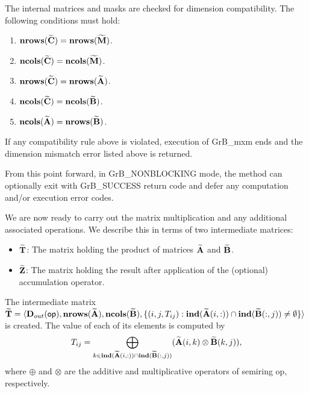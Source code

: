 The internal matrices and masks are checked for dimension compatibility. The following
conditions must hold:
\begin{enumerate}
	\item $\bold{nrows}({\bf \widetilde{C}}) = \bold{nrows}({\bf \widetilde{M}})$.

	\item $\bold{ncols}({\bf \widetilde{C}}) = \bold{ncols}({\bf \widetilde{M}})$.

	\item $\bold{nrows}({\bf \widetilde{C}}) = \bold{nrows}({\bf \widetilde{A}})$.

	\item $\bold{ncols}({\bf \widetilde{C}}) = \bold{ncols}({\bf \widetilde{B}})$.

	\item $\bold{ncols}({\bf \widetilde{A}}) = \bold{nrows}({\bf \widetilde{B}})$.
\end{enumerate}
If any compatibility rule above is violated, execution of {\sf GrB\_mxm} ends and
the dimension mismatch error listed above is returned.

From this point forward, in {\sf GrB\_NONBLOCKING} mode, the method can 
optionally exit with {\sf GrB\_SUCCESS} return code and defer any computation 
and/or execution error codes.

We are now ready to carry out the matrix multiplication and any additional 
associated operations.  We describe this in terms of two intermediate matrices:
\begin{itemize}
    \item ${\bf \widetilde{T}}$: The matrix holding the product of matrices 
    ${\bf \widetilde{A}}$ and ${\bf \widetilde{B}}$.
    \item ${\bf \widetilde{Z}}$: The matrix holding the result after 
    application of the (optional) accumulation operator.
\end{itemize}

The intermediate matrix ${\bf \widetilde{T}} = \langle
\mbox{$\mathbf{D}_{out}$}({\sf op}), \bold{nrows}({\bf \widetilde{A}}), \bold{ncols}({\bf \widetilde{B}}),
\{(i,j,T_{ij}) : \bold{ind}({\bf \widetilde{A}}(i,:)) \cap
\bold{ind}({\bf \widetilde{B}}(:,j)) \neq \emptyset \} \rangle$
is created.  The value of each of its elements is computed by 
\[T_{ij} = \bigoplus_{k \in \bold{ind}({\bf \widetilde{A}}(i,:)) \cap
\bold{ind}({\bf \widetilde{B}}(:,j))} ({\bf \widetilde{A}}(i,k)
\otimes {\bf \widetilde{B}}(k,j)),\] where $\oplus$ and $\otimes$
are the additive and multiplicative operators of semiring {\sf op},
respectively.

